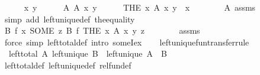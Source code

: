 \begin{isabellebody}
\ \ \ \ \isamarkupfalse%
\ x\ y\isanewline
\ \ \ \ \isamarkupfalse%
\ A{\isacharcolon}{\kern0pt}\ {\isachardoublequoteopen}A\ x\ y{\isachardoublequoteclose}\isanewline
\ \ \ \ \isamarkupfalse%
\ {\isachardoublequoteopen}{\isacharparenleft}{\kern0pt}THE\ x{\isachardot}{\kern0pt}\ A\ x\ y{\isacharparenright}{\kern0pt}\ {\isacharequal}{\kern0pt}\ x{\isachardoublequoteclose}\isanewline
\ \ \ \ \ \ \isamarkupfalse%
\ A\ assms\ \isamarkupfalse%
\ {\isacharparenleft}{\kern0pt}simp\ add{\isacharcolon}{\kern0pt}\ left{\isacharunderscore}{\kern0pt}unique{\isacharunderscore}{\kern0pt}def\ the{\isacharunderscore}{\kern0pt}equality{\isacharparenright}{\kern0pt}\isanewline
\ \ \ \ \isamarkupfalse%
\ \isamarkupfalse%
\ {\isachardoublequoteopen}B\ {\isacharparenleft}{\kern0pt}f\ x{\isacharparenright}{\kern0pt}\ {\isacharparenleft}{\kern0pt}SOME\ z{\isachardot}{\kern0pt}\ B\ {\isacharparenleft}{\kern0pt}f\ {\isacharparenleft}{\kern0pt}THE\ x{\isachardot}{\kern0pt}\ A\ x\ y{\isacharparenright}{\kern0pt}{\isacharparenright}{\kern0pt}\ z{\isacharparenright}{\kern0pt}{\isachardoublequoteclose}\isanewline
\ \ \ \ \ \ \isamarkupfalse%
\ assms\ \isamarkupfalse%
\ {\isacharparenleft}{\kern0pt}force\ simp{\isacharcolon}{\kern0pt}\ left{\isacharunderscore}{\kern0pt}total{\isacharunderscore}{\kern0pt}def\ intro{\isacharcolon}{\kern0pt}\ someI{\isacharunderscore}{\kern0pt}ex{\isacharparenright}{\kern0pt}\isanewline
\ \ \isamarkupfalse%
\isanewline
{}\isamarkupfalse%
%
\endisatagproof
{\isafoldproof}%
%
\isadelimproof
\isanewline
%
\endisadelimproof
\isanewline
{}\isamarkupfalse%
\ left{\isacharunderscore}{\kern0pt}unique{\isacharunderscore}{\kern0pt}fun{\isacharbrackleft}{\kern0pt}transfer{\isacharunderscore}{\kern0pt}rule{\isacharbrackright}{\kern0pt}{\isacharcolon}{\kern0pt}\isanewline
\ \ {\isachardoublequoteopen}{\isasymlbrakk}left{\isacharunderscore}{\kern0pt}total\ A{\isacharsemicolon}{\kern0pt}\ left{\isacharunderscore}{\kern0pt}unique\ B{\isasymrbrakk}\ {\isasymLongrightarrow}\ left{\isacharunderscore}{\kern0pt}unique\ {\isacharparenleft}{\kern0pt}A\ {\isacharequal}{\kern0pt}{\isacharequal}{\kern0pt}{\isacharequal}{\kern0pt}{\isachargreater}{\kern0pt}\ B{\isacharparenright}{\kern0pt}{\isachardoublequoteclose}\isanewline
%
\isadelimproof
\ \ %
\endisadelimproof
%
\isatagproof
{}\isamarkupfalse%
\ left{\isacharunderscore}{\kern0pt}total{\isacharunderscore}{\kern0pt}def\ left{\isacharunderscore}{\kern0pt}unique{\isacharunderscore}{\kern0pt}def\ rel{\isacharunderscore}{\kern0pt}fun{\isacharunderscore}{\kern0pt}def\isanewline

\end{isabellebody}
